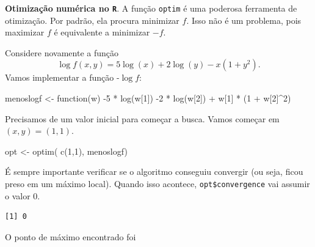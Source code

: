 \documentclass[
  letterpaper,
  DIV=11,
  numbers=noendperiod]{scrartcl}
\newenvironment{Shaded}{\begin{snugshade}}{\end{snugshade}}
\newcommand{\ControlFlowTok}[1]{\textcolor[rgb]{0.00,0.23,0.31}{#1}}
\newcommand{\DecValTok}[1]{\textcolor[rgb]{0.68,0.00,0.00}{#1}}
\newcommand{\FunctionTok}[1]{\textcolor[rgb]{0.28,0.35,0.67}{#1}}
\newcommand{\NormalTok}[1]{\textcolor[rgb]{0.00,0.23,0.31}{#1}}
\newcommand{\OtherTok}[1]{\textcolor[rgb]{0.00,0.23,0.31}{#1}}
\newcommand{\SpecialCharTok}[1]{\textcolor[rgb]{0.37,0.37,0.37}{#1}}
\begin{document}
\textbf{Otimização numérica no \texttt{R}}. A função \texttt{optim} é
uma poderosa ferramenta de otimização. Por padrão, ela procura minimizar
\(f\). Isso não é um problema, pois maximizar \(f\) é equivalente a
minimizar \(-f\).

Considere novamente a função \[\log f(x,y)=5\log(x)+2\log(y)-x(1+y^2).\]
Vamos implementar a função -\(\log f\):

\begin{Shaded}
\begin{Highlighting}[]
\NormalTok{menoslogf }\OtherTok{\textless{}{-}} \ControlFlowTok{function}\NormalTok{(w) }\SpecialCharTok{{-}}\DecValTok{5} \SpecialCharTok{*} \FunctionTok{log}\NormalTok{(w[}\DecValTok{1}\NormalTok{]) }\SpecialCharTok{{-}}\DecValTok{2} \SpecialCharTok{*} \FunctionTok{log}\NormalTok{(w[}\DecValTok{2}\NormalTok{]) }\SpecialCharTok{+}\NormalTok{ w[}\DecValTok{1}\NormalTok{] }\SpecialCharTok{*}\NormalTok{ (}\DecValTok{1} \SpecialCharTok{+}\NormalTok{ w[}\DecValTok{2}\NormalTok{]}\SpecialCharTok{\^{}}\DecValTok{2}\NormalTok{)}
\end{Highlighting}
\end{Shaded}

Precisamos de um valor inicial para começar a busca. Vamos começar em
\((x,y)=(1,1)\).

\begin{Shaded}
\begin{Highlighting}[]
\NormalTok{opt }\OtherTok{\textless{}{-}} \FunctionTok{optim}\NormalTok{( }\FunctionTok{c}\NormalTok{(}\DecValTok{1}\NormalTok{,}\DecValTok{1}\NormalTok{), menoslogf)}
\end{Highlighting}
\end{Shaded}

É sempre importante verificar se o algoritmo conseguiu convergir (ou
seja, ficou preso em um máximo local). Quando isso acontece,
\texttt{opt\$convergence} vai assumir o valor 0.

\begin{Shaded}
\end{Shaded}

\begin{verbatim}
[1] 0
\end{verbatim}

O ponto de máximo encontrado foi

\begin{Shaded}
\end{Shaded}
\end{document}
